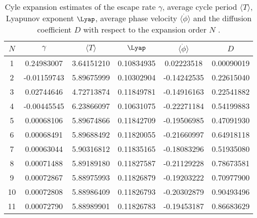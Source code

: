 \begin{table}
	\begin{tabular}{c|c|c|c|c|c}
	 $N$ & $\gamma$ & $\langle T \rangle$ & $\Lyap$ & $\langle \dot{\phi} \rangle$ & $D$ \\
	\hline
	1 & 0.24983007 & 3.64151210 & 0.10834935 & 0.02223518 & 0.00090019 \\
 	2 & -0.01159743 & 5.89675999 & 0.10302904 & -0.14242535 & 0.22615040 \\
 	3 & 0.02744646 & 4.72713874 & 0.11849781 & -0.14916163 & 0.22541882 \\
 	4 & -0.00445545 & 6.23866097 & 0.10631075 & -0.22271184 & 0.54199883 \\
 	5 & 0.00068106 & 5.89674866 & 0.11842709 & -0.19506985 & 0.47091930 \\
 	6 & 0.00068491 & 5.89688492 & 0.11820055 & -0.21660997 & 0.64918118 \\
 	7 & 0.00063044 & 5.90316812 & 0.11835165 & -0.18083296 & 0.51935080 \\
 	8 & 0.00071488 & 5.89189180 & 0.11827587 & -0.21129228 & 0.78673581 \\
 	9 & 0.00072867 & 5.88975993 & 0.11826879 & -0.19203222 & 0.70977900 \\
 	10 & 0.00072808 & 5.88986409 & 0.11826793 & -0.20302879 & 0.90493496 \\
 	11 & 0.00072790 & 5.88989901 & 0.11826783 & -0.19453187 & 0.86683629 \\
 	\end{tabular}
	\caption{Cyle expansion estimates of the escape rate $\gamma$, average cycle period $\langle T \rangle$, Lyapunov exponent $\Lyap$, average phase velocity $\langle \dot{\phi} \rangle$ and the diffusion coefficient $D$ with respect to the expansion order $N$ .}
	\label{t-DynamicalAverages}
\end{table}

